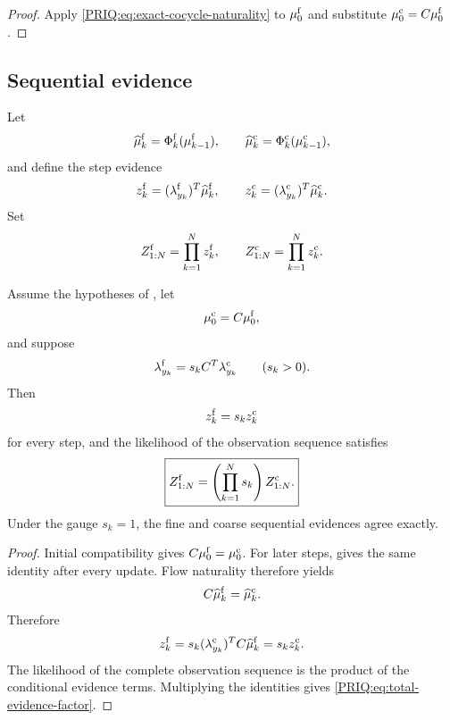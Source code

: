 \begin{proof}
Apply \eqref{PRIQ:eq:exact-cocycle-naturality} to $\mu_0^{\mathrm f}$ and substitute $\mu_0^{\mathrm c}=C\mu_0^{\mathrm f}$.
\end{proof}

\subsection{Sequential evidence}
Let
\[
  \widehat\mu_k^{\mathrm f}
  =\Phi_k^{\mathrm f}(\mu_{k-1}^{\mathrm f}),
  \qquad
  \widehat\mu_k^{\mathrm c}
  =\Phi_k^{\mathrm c}(\mu_{k-1}^{\mathrm c}),
\]
and define the step evidence
\[
  z_k^{\mathrm f}
  =(\lambda_{y_k}^{\mathrm f})^T\widehat\mu_k^{\mathrm f},
  \qquad
  z_k^{\mathrm c}
  =(\lambda_{y_k}^{\mathrm c})^T\widehat\mu_k^{\mathrm c}.
\]
Set
\[
  Z_{1:N}^{\mathrm f}=\prod_{k=1}^N z_k^{\mathrm f},
  \qquad
  Z_{1:N}^{\mathrm c}=\prod_{k=1}^N z_k^{\mathrm c}.
\]

\begin{PRIQtheorem}\label{PRIQ:thm:evidence-factorization}
Assume the hypotheses of , let
\[
  \mu_0^{\mathrm c}=C\mu_0^{\mathrm f},
\]
and suppose
\[
  \lambda_{y_k}^{\mathrm f}
  =s_kC^T\lambda_{y_k}^{\mathrm c}
  \qquad(s_k>0).
\]
Then
\begin{equation}\label{PRIQ:eq:step-evidence-factor}
  z_k^{\mathrm f}=s_kz_k^{\mathrm c}
\end{equation}
for every step, and the likelihood of the observation sequence satisfies
\begin{equation}\label{PRIQ:eq:total-evidence-factor}
  \boxed{
  Z_{1:N}^{\mathrm f}
  =
  \left(\prod_{k=1}^Ns_k\right)
  Z_{1:N}^{\mathrm c}.}
\end{equation}
Under the gauge $s_k=1$, the fine and coarse sequential evidences agree exactly.
\end{PRIQtheorem}

\begin{proof}
Initial compatibility gives $C\mu_0^{\mathrm f}=\mu_0^{\mathrm c}$.  For later steps,  gives the same identity after every update.  Flow naturality therefore yields
\[
  C\widehat\mu_k^{\mathrm f}=\widehat\mu_k^{\mathrm c}.
\]
Therefore
\[
  z_k^{\mathrm f}
  =s_k(\lambda_{y_k}^{\mathrm c})^TC\widehat\mu_k^{\mathrm f}
  =s_kz_k^{\mathrm c}.
\]
The likelihood of the complete observation sequence is the product of the conditional evidence terms.  Multiplying the identities gives \eqref{PRIQ:eq:total-evidence-factor}.
\end{proof}

